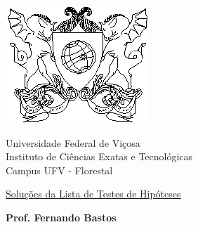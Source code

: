 \documentclass{article}
\begin{document}


\vspace*{-2cm}

\begin{center}
\begin{minipage}[s]{2cm}
\hspace{-1.3cm}\includegraphics[scale=1.0]{Figuras/brasaoufv.eps}
\end{minipage}
\begin{minipage}[s]{13cm}
{\begin{center} {\sc \Large Universidade Federal de Vi\c{c}osa}\\
{\sc \large Instituto de Ci\^encias Exatas e Tecnológicas}\\
{\sc \large Campus UFV - Florestal}\\
\end{center}}
\end{minipage}\begin{minipage}[s]{2 cm}
\end{minipage}
\end{center}

\vspace{-0.3cm}



\medskip

\begin{center}

\underline{\underline{{\large{\sc Soluções da Lista de Testes de Hipóteses}}}}

\bigskip

{\large {\bf Prof. Fernando Bastos}}
%
\end{center}
\end{document}
